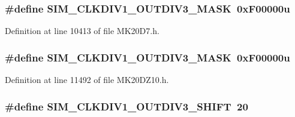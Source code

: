 \subsubsection[{\texorpdfstring{S\+I\+M\+\_\+\+C\+L\+K\+D\+I\+V1\+\_\+\+O\+U\+T\+D\+I\+V3\+\_\+\+M\+A\+SK}{SIM_CLKDIV1_OUTDIV3_MASK}}]{\setlength{\rightskip}{0pt plus 5cm}\#define S\+I\+M\+\_\+\+C\+L\+K\+D\+I\+V1\+\_\+\+O\+U\+T\+D\+I\+V3\+\_\+\+M\+A\+SK~0x\+F00000u}\hypertarget{group___s_i_m___register___masks_ga0a017e7ea9a2d31e9b23aa2cab06c19d}{}\label{group___s_i_m___register___masks_ga0a017e7ea9a2d31e9b23aa2cab06c19d}


Definition at line 10413 of file M\+K20\+D7.\+h.

\subsubsection[{\texorpdfstring{S\+I\+M\+\_\+\+C\+L\+K\+D\+I\+V1\+\_\+\+O\+U\+T\+D\+I\+V3\+\_\+\+M\+A\+SK}{SIM_CLKDIV1_OUTDIV3_MASK}}]{\setlength{\rightskip}{0pt plus 5cm}\#define S\+I\+M\+\_\+\+C\+L\+K\+D\+I\+V1\+\_\+\+O\+U\+T\+D\+I\+V3\+\_\+\+M\+A\+SK~0x\+F00000u}\hypertarget{group___s_i_m___register___masks_ga0a017e7ea9a2d31e9b23aa2cab06c19d}{}\label{group___s_i_m___register___masks_ga0a017e7ea9a2d31e9b23aa2cab06c19d}


Definition at line 11492 of file M\+K20\+D\+Z10.\+h.

\subsubsection[{\texorpdfstring{S\+I\+M\+\_\+\+C\+L\+K\+D\+I\+V1\+\_\+\+O\+U\+T\+D\+I\+V3\+\_\+\+S\+H\+I\+FT}{SIM_CLKDIV1_OUTDIV3_SHIFT}}]{\setlength{\rightskip}{0pt plus 5cm}\#define S\+I\+M\+\_\+\+C\+L\+K\+D\+I\+V1\+\_\+\+O\+U\+T\+D\+I\+V3\+\_\+\+S\+H\+I\+FT~20}\hypertarget{group___s_i_m___register___masks_gab5533e40e65e365a9bb32edf707ac9f0}{}\label{group___s_i_m___register___masks_gab5533e40e65e365a9bb32edf707ac9f0}


